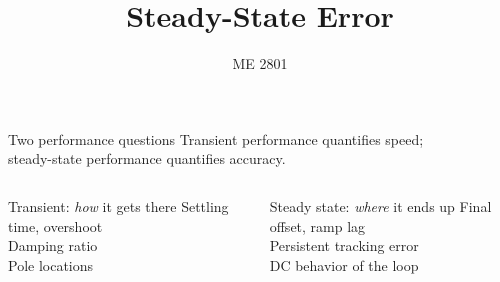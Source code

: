\documentclass[aspectratio=169,12pt]{beamer}
\title{Steady-State Error}
\author{ME 2801}%
\date{}
\begin{document}
\maketitle


\begin{frame}{Two performance questions}
  Transient performance quantifies speed; \\
  steady-state performance quantifies accuracy.

  \bigskip
  \begin{columns}[T]
    \begin{block}{Transient: \emph{how} it gets there}
      Settling time, overshoot\\
      Damping ratio\\
      Pole locations
    \end{block}
    \begin{block}{Steady state: \emph{where} it ends up}
      Final offset, ramp lag\\
      Persistent tracking error\\
      DC behavior of the loop
    \end{block}
  \end{columns}
\end{frame}
\end{document}
